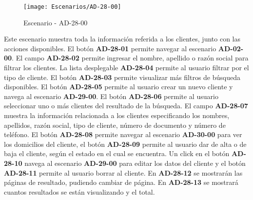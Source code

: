 \begin{figure}[H]
\centering
\texttt{[image: Escenarios/AD-28-00]}
\caption{Escenario - AD-28-00}
\label{fig:AD-28-00}
\end{figure}
Este escenario muestra toda la información referida a los clientes, junto con las acciones disponibles.
El botón \textbf{AD-28-01} permite navegar al escenario \textbf{AD-02-00}. El campo \textbf{AD-28-02} permite ingresar el nombre, apellido o razón social para filtrar los clientes. La lista desplegable \textbf{AD-28-04} permite al usuario filtrar por el tipo de cliente. El botón \textbf{AD-28-03} permite visualizar más filtros de búsqueda disponibles.
El botón \textbf{AD-28-05} permite al usuario crear un nuevo cliente y navega al escenario \textbf{AD-29-00}.
El botón \textbf{AD-28-06} permite al usuario seleccionar uno o más clientes del resultado de la búsqueda. El campo \textbf{AD-28-07} muestra la información relacionada a los clientes  especificando los nombres, apellidos, razón social, tipo de cliente, número de documento y número de teléfono. El botón \textbf{AD-28-08} permite navegar al escenario \textbf{AD-30-00} para ver los domicilios del cliente, el botón \textbf{AD-28-09} permite al usuario dar de alta o de baja el cliente, según el estado en el cual se encuentra. Un click en el botón \textbf{AD-28-10} navega al escenario \textbf{AD-29-00} para editar los datos del cliente y el botón \textbf{AD-28-11} permite al usuario borrar al cliente.
En  \textbf{AD-28-12} se mostrarán las páginas de resultado, pudiendo cambiar de página. En \textbf{AD-28-13} se mostrará cuantos resultados se están visualizando y el total.
\clearpage
